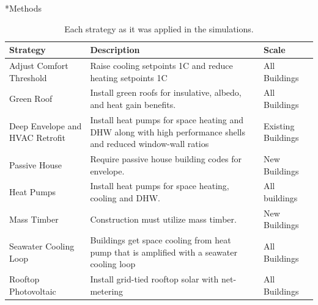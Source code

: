 \documentclass[twocolumn, a4paper,10pt]{article}
\makeatletter
\renewcommand\section{\@startsection{section}{1}{\z@}{3pt}{3pt}{\normalfont\large\bfseries}}
\makeatother
\begin{document}
\section*{Methods}

\begin{table}[ht]
    \vspace{-5pt}   %
    \caption{Each strategy as it was applied in the simulations.}
    \footnotesize
    \label{tab:strategies}
    \centering
    \begin{tabularx}{\textwidth}{|X|X|X|}
        \hline
        \bf{Strategy} & \bf{Description} & \bf{Scale} \\
        \hline
        Adjust Comfort Threshold & Raise cooling setpoints 1C and reduce heating setpoints 1C & All Buildings \\
        \hline
        Green Roof & Install green roofs for insulative, albedo, and heat gain benefits. & All Buildings \\
        \hline
        Deep Envelope and HVAC Retrofit & Install heat pumps for space heating and DHW along with high performance shells and reduced window-wall ratios & Existing Buildings \\
        \hline
        Passive House & Require passive house building codes for envelope. & New Buildings \\
        \hline
        Heat Pumps & Install heat pumps for space heating, cooling and DHW. & All buildings \\
        \hline
        Mass Timber & Construction must utilize mass timber. & New Buildings \\
        \hline
        Seawater Cooling Loop & Buildings get space cooling from heat pump that is amplified with a seawater cooling loop & All Buildings \\
        \hline
        Rooftop Photovoltaic & Install grid-tied rooftop solar with net-metering & All Buildings \\
        \hline
    \end{tabularx}
    \vspace{-5pt}   %
\end{table}
\end{document}
